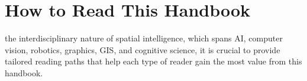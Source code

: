 











\section{How to Read This Handbook}
\label{sec:p1-sec3-how-to-read-this-handbook}


 the interdisciplinary nature of spatial intelligence, which spans AI, computer vision, robotics, graphics, GIS, and cognitive science, it is crucial to provide tailored reading paths that help each type of reader gain the most value from this handbook.

